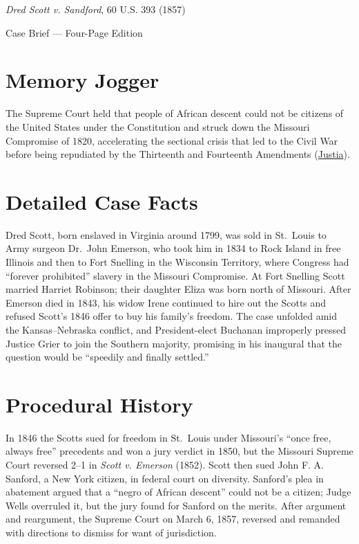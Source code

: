\documentclass[12pt]{article}
\begin{document}
\begin{center}
{\LARGE \textit{Dred Scott v. Sandford}, 60 U.S. 393 (1857)\par}
\vspace{0.8em}
{\large Case Brief --- Four-Page Edition\par}
\end{center}
\vspace{1em}

\section{Memory Jogger}

The Supreme Court held that people of African descent could not be citizens of the United States under the Constitution and struck down the Missouri Compromise of 1820, accelerating the sectional crisis that led to the Civil War before being repudiated by the Thirteenth and Fourteenth Amendments (\href{https://supreme.justia.com/cases/federal/us/60/393/}{Justia}).

\section{Detailed Case Facts}

Dred Scott, born enslaved in Virginia around 1799, was sold in St.\ Louis to Army surgeon Dr.\ John Emerson, who took him in 1834 to Rock Island in free Illinois and then to Fort Snelling in the Wisconsin Territory, where Congress had ``forever prohibited'' slavery in the Missouri Compromise. At Fort Snelling Scott married Harriet Robinson; their daughter Eliza was born north of Missouri. After Emerson died in 1843, his widow Irene continued to hire out the Scotts and refused Scott's 1846 offer to buy his family's freedom. The case unfolded amid the Kansas--Nebraska conflict, and President-elect Buchanan improperly pressed Justice Grier to join the Southern majority, promising in his inaugural that the question would be ``speedily and finally settled.''

\section{Procedural History}

In 1846 the Scotts sued for freedom in St.\ Louis under Missouri's ``once free, always free'' precedents and won a jury verdict in 1850, but the Missouri Supreme Court reversed 2--1 in \textit{Scott v. Emerson} (1852). Scott then sued John F. A. Sanford, a New York citizen, in federal court on diversity. Sanford's plea in abatement argued that a ``negro of African descent'' could not be a citizen; Judge Wells overruled it, but the jury found for Sanford on the merits. After argument and reargument, the Supreme Court on March 6, 1857, reversed and remanded with directions to dismiss for want of jurisdiction.
\end{document}
